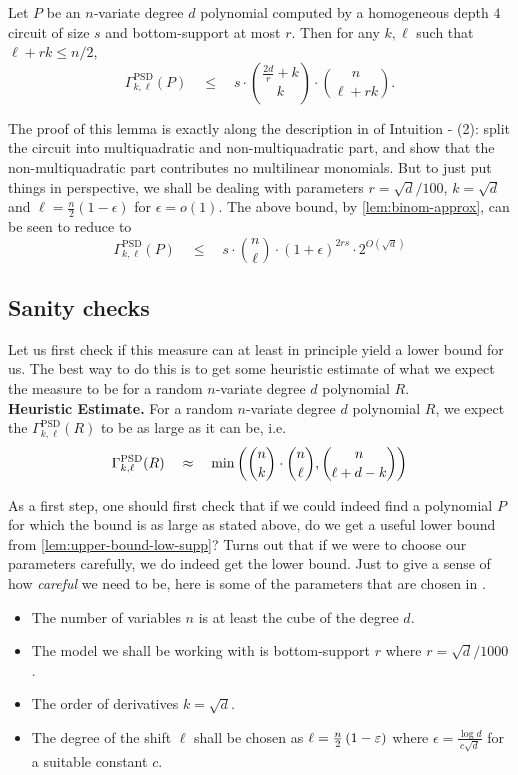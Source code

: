 \begin{lemma}\label{lem:upper-bound-low-supp}
Let $P$ be an $n$-variate degree $d$ polynomial computed by a homogeneous depth $4$ circuit of size $s$ and bottom-support at most $r$. Then for any $k,\ell$ such that $\ell + rk \leq n/2$, 
\[
\Gamma^{\mathrm{PSD}}_{k,\ell}(P) \quad \leq \quad s \cdot \binom{\frac{2d}{r}+k}{k}\cdot \binom{n}{\ell+rk}. 
\]
\end{lemma}

The proof of this lemma is exactly along the description in of Intuition - (2): split the circuit into multiquadratic and non-multiquadratic part, and show that the non-multiquadratic part contributes no multilinear monomials. But to just put things in perspective, we shall be dealing with parameters $r = \sqrt{d}/100$, $k = \sqrt{d}$ and $\ell = \frac{n}{2}(1 - \epsilon)$ for $\epsilon = o(1)$. The above bound, by \autoref{lem:binom-approx}, can be seen to reduce to
\[
\Gamma^{\mathrm{PSD}}_{k,\ell}(P) \quad \leq \quad s \cdot \binom{n}{\ell} \cdot (1+\epsilon)^{2rs} \cdot 2^{O(\sqrt{d})}
\]


\subsection*{Sanity checks}

Let us first check if this measure can at least in principle yield a lower bound for us. The best way to do this is to get some heuristic estimate of what we expect the measure to be for a random $n$-variate degree $d$ polynomial $R$. \\

{\bf Heuristic Estimate. } For a random $n$-variate degree $d$ polynomial $R$, we expect the $\Gamma^{\mathrm{PSD}}_{k,\ell}(R)$ to be as large as it can be, i.e.
\[
\Gamma^{\mathrm{PSD}}_{k,\ell}(R) \quad \approx \quad \min\left(\binom{n}{k}\cdot \binom{n}{\ell}, \binom{n}{\ell + d-k}\right)
\]

As a first step, one should first check that if we could indeed find a polynomial $P$ for which the bound is as large as stated above, do we get a useful lower bound from \autoref{lem:upper-bound-low-supp}? Turns out that if we were to choose our parameters carefully, we do indeed get the lower bound. Just to give a sense of how \emph{careful} we need to be, here is some of the parameters that are chosen in \cite{KLSS,KS14}. 

\begin{itemize}
\item The number of variables $n$ is at least the cube of the degree $d$. 
\item The model we shall be working with is bottom-support $r$ where $r = \sqrt{d}/1000$. 
\item The order of derivatives $k = \sqrt{d}$. 
\item The degree of the shift $\ell$ shall be chosen as $\ell = \frac{n}{2}\left(1 - \varepsilon\right)$ where $\epsilon = \frac{\log d}{c\sqrt{d}}$ for a suitable constant $c$. 
\end{itemize}

